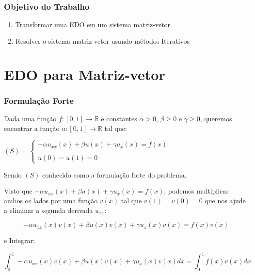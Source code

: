 
\begin{frame}
  \frametitle{Objetivo do Trabalho}
  \begin{enumerate}
    \item Transformar uma EDO em um sistema matriz-vetor
    \vspace{1cm}
    \item Resolver o sistema matriz-vetor usando métodos Iterativos
  \end{enumerate}
\end{frame}

\section{EDO para Matriz-vetor}
\begin{frame}
  \frametitle{Formulação Forte}

  Dada uma função $f : [0,1] \to \mathbb{R}$ e constantes $\alpha > 0$, $\beta \geq 0$ e $\gamma \geq 0$, queremos encontrar a função $u : [0,1] \to \mathbb{R}$ tal que:

  \vspace{0.5cm}

  \begin{center}
    $(S) = \begin{cases}
      -\alpha u_{xx}(x) + \beta u(x) + \gamma u_{x}(x) = f(x) \\
      \\
      u(0) = u(1) = 0
    \end{cases}$
  \end{center}

  \vspace{0.5cm}

  Sendo $(S)$ conhecido como a formulação forte do problema.
\end{frame}

\begin{frame}

  Visto que $-\alpha u_{xx}(x) + \beta u(x) + \gamma u_{x}(x) = f(x)$, podemos multiplicar ambos os lados por uma função $v(x)$ tal que $v(1) = v(0) = 0$ que nos ajude a eliminar a segunda derivada $u_{xx}$:

  \vspace{0.5cm}

 \[-\alpha u_{xx}(x)v(x) + \beta u(x)v(x) + \gamma u_{x}(x)v(x) = f(x)v(x)\]

 \vspace{0.5cm}

 e Integrar:

 \vspace{0.5cm}

 \[\int^{1}_{0} -\alpha u_{xx}(x)v(x) + \beta u(x)v(x) + \gamma u_{x}(x)v(x) dx = \int^{1}_{0} f(x)v(x) dx\]
\end{frame}

